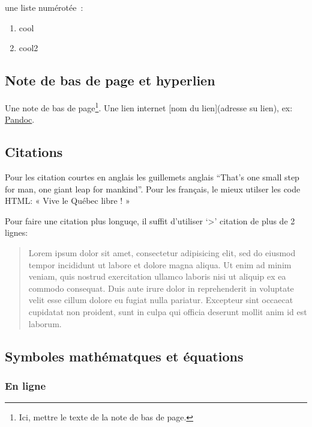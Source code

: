 une liste numérotée~:

\begin{enumerate}
\def\labelenumi{\arabic{enumi}.}
\tightlist
\item
  cool
\item
  cool2
\end{enumerate}

\subsection{Note de bas de page et
hyperlien}\label{note-de-bas-de-page-et-hyperlien}

Une note de bas de page\footnote{Ici, mettre le texte de la note de bas
  de page.}. Une lien internet {[}nom du lien{]}(adresse su lien), ex:
\href{http://pandoc.org}{Pandoc}.

\subsection*{Citations}\label{citations}

Pour les citation courtes en anglais les guillemets anglais ``That's one
small step for man, one giant leap for mankind''. Pour les français, le
mieux utilser les code HTML: « Vive le Québec libre ! »

Pour faire une citation plus longuqe, il suffit d'utiliser
`\textgreater{}' citation de plus de 2 lignes:

\begin{quote}
Lorem ipsum dolor sit amet, consectetur adipisicing elit, sed do eiusmod
tempor incididunt ut labore et dolore magna aliqua. Ut enim ad minim
veniam, quis nostrud exercitation ullamco laboris nisi ut aliquip ex ea
commodo consequat. Duis aute irure dolor in reprehenderit in voluptate
velit esse cillum dolore eu fugiat nulla pariatur. Excepteur sint
occaecat cupidatat non proident, sunt in culpa qui officia deserunt
mollit anim id est laborum.
\end{quote}

\subsection*{Symboles mathématques et
équations}\label{symboles-mathuxe9matques-et-uxe9quations}

\subsubsection*{En ligne}\label{en-ligne}

